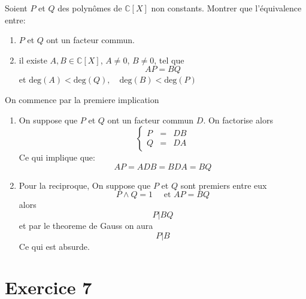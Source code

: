 \documentclass{report}
\begin{document}
\qs{}
{

  Soient $P$ et $Q$ des polynômes de $\mathbb{C}[X]$ non constants. Montrer  que
l'équivalence entre:

\begin{enumerate}
  \item $P$ et $Q$ ont un facteur commun.
  \item il existe $A,B\in \mathbb{C}[X]$, $A\neq0$, $B\neq 0$, tel que
    $$
    AP = BQ
    $$
  et $\text{deg}(A)< \text{deg}(Q),\quad \text{deg}(B)<\text{deg}(P)$ 
\end{enumerate}
}

\begin{myproof}
  On commence par la premiere implication
  \begin{enumerate}
    \item On suppose que $P$ et $Q$ ont un facteur commun $D$. On factorise alors 
      $$
      \left\{\begin{array}{lll}
          P&=&DB\\[4pt]
          Q&=&DA
        \end{array}
      \right.
      $$
      Ce qui implique que:
      $$
      AP = ADB = BDA = BQ
      $$
    \item Pour la reciproque, On suppose que $P$ et $Q$ sont premiers entre eux
      $$
      P \wedge Q = 1 \quad \text{ et } AP = BQ
      $$
      alors 
      $$
      P | BQ
      $$
      et par le theoreme de Gauss on aura
      $$
      P | B
      $$
      Ce qui est absurde.
  \end{enumerate}
\end{myproof}

\section{Exercice 7} %
\label{sec:Exercice 7}
\end{document}

